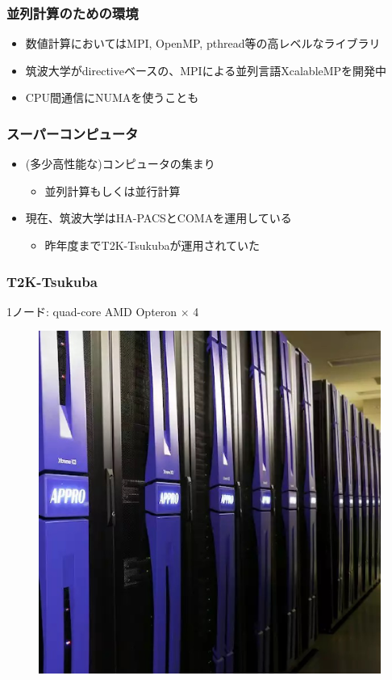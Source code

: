 \documentclass[dvipdfmx,20pt,notheorems,t]{beamer}
\begin{document}
\begin{frame}\frametitle{並列計算のための環境}
\begin{itemize}
\item 数値計算においてはMPI, OpenMP, pthread等の高レベルなライブラリ
\item 筑波大学がdirectiveベースの、MPIによる並列言語XcalableMPを開発中
\item CPU間通信にNUMAを使うことも
\end{itemize}
\end{frame}

\begin{frame}\frametitle{スーパーコンピュータ}
\begin{itemize}
\item (多少高性能な)コンピュータの集まり
\begin{itemize}
\item 並列計算もしくは並行計算
\end{itemize}
\item 現在、筑波大学はHA-PACSとCOMAを運用している
\begin{itemize}
\item 昨年度までT2K-Tsukubaが運用されていた
\end{itemize}
\end{itemize}
\end{frame}

\begin{frame}\frametitle{T2K-Tsukuba}
\small
1ノード: quad-core AMD Opteron $\times$ 4
\begin{figure}[htb]
\centering
\includegraphics[height=0.6\textheight]{t2kt.eps}
\end{figure}
\end{frame}
\end{document}
